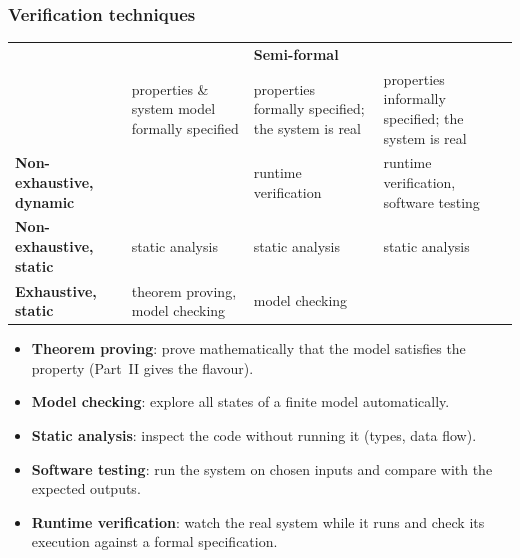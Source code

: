 \subsubsection{Verification techniques}

\begin{center}
\small
\renewcommand{\arraystretch}{1.3}
\footnotesize
\begin{tabularx}{\linewidth}{@{}>{\raggedright\arraybackslash}p{2.3cm}|>{\centering\arraybackslash}X>{\centering\arraybackslash}X>{\centering\arraybackslash}X@{}}
 & \multicolumn{2}{c}{\textbf{Formal}} & \textbf{Semi-formal} \\
 & properties \& system model formally specified & properties formally specified; the system is real & properties informally specified; the system is real \\
\hline
\textbf{Non-exhaustive, dynamic} & & \cellcolor{nbgreen!15}runtime verification & \cellcolor{nbblue!10}runtime verification, software testing \\
\textbf{Non-exhaustive, static} & \cellcolor{nborange!12}static analysis & \cellcolor{nborange!12}static analysis & \cellcolor{nborange!12}static analysis \\
\textbf{Exhaustive, static} & \cellcolor{nbpurple!12}theorem proving, model checking & \cellcolor{nbpurple!12}model checking & \\
\end{tabularx}
\end{center}

\begin{itemize}[nosep]
  \item \textbf{Theorem proving}: prove mathematically that the model satisfies the property
        (Part~II gives the flavour).
  \item \textbf{Model checking}: explore all states of a finite model automatically.
  \item \textbf{Static analysis}: inspect the code without running it (types, data flow).
  \item \textbf{Software testing}: run the system on chosen inputs and compare with the
        expected outputs.
  \item \textbf{Runtime verification}: watch the real system while it runs and check its
        execution against a formal specification.
\end{itemize}

